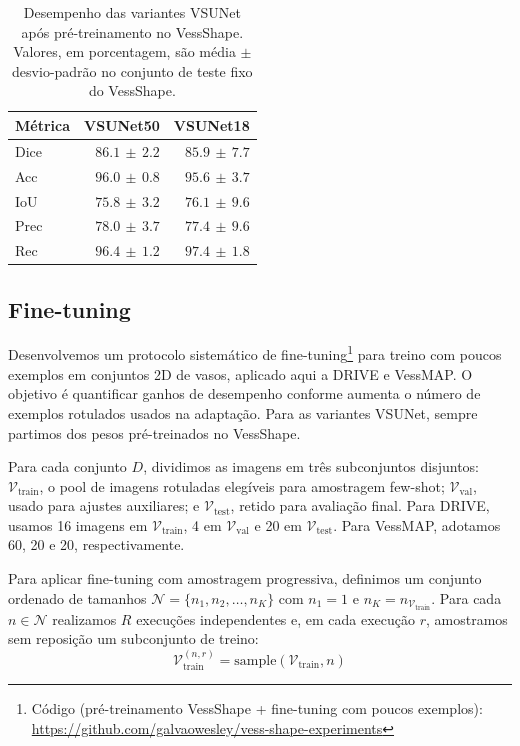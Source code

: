\documentclass[%
reprint,
nofootinbib,
 amsmath,amssymb,
aps,
floatfix,
superscriptaddress,
showkeys,
longbibliography
]{revtex4-1}
\begin{document}
\begin{table}[t]
    \caption{Desempenho das variantes VSUNet após pré-treinamento no VessShape. Valores, em porcentagem, são média $\pm$ desvio-padrão no conjunto de teste fixo do VessShape.}
    \label{tab:vessshape_results_percent}
    \centering
    \begingroup
    \small
    \setlength{\tabcolsep}{6pt}
    \renewcommand{\arraystretch}{1.15}
    \begin{tabular}{l r r}
        \hline
        \textbf{Métrica} & \textbf{VSUNet50} & \textbf{VSUNet18} \\
        \hline
        Dice & $86.1 \,\pm\, 2.2$ & $85.9 \,\pm\, 7.7$ \\
        Acc & $96.0 \,\pm\, 0.8$ & $95.6 \,\pm\, 3.7$ \\
        IoU & $75.8 \,\pm\, 3.2$ & $76.1 \,\pm\, 9.6$ \\
        Prec & $78.0 \,\pm\, 3.7$ & $77.4 \,\pm\, 9.6$ \\
        Rec & $96.4 \,\pm\, 1.2$ & $97.4 \,\pm\, 1.8$ \\
        \hline
    \end{tabular}
    \endgroup
\end{table}



\subsection{Fine-tuning}

Desenvolvemos um protocolo sistemático de fine-tuning\footnote{Código (pré-treinamento VessShape + fine-tuning com poucos exemplos): \url{https://github.com/galvaowesley/vess-shape-experiments} } para treino com poucos exemplos em conjuntos 2D de vasos, aplicado aqui a DRIVE e VessMAP. O objetivo é quantificar ganhos de desempenho conforme aumenta o número de exemplos rotulados usados na adaptação. Para as variantes VSUNet, sempre partimos dos pesos pré-treinados no VessShape.

Para cada conjunto $D$, dividimos as imagens em três subconjuntos disjuntos: $\mathcal{V}_{\text{train}}$, o pool de imagens rotuladas elegíveis para amostragem few-shot; $\mathcal{V}_{\text{val}}$, usado para ajustes auxiliares; e $\mathcal{V}_{\text{test}}$, retido para avaliação final. Para DRIVE, usamos 16 imagens em $\mathcal{V}_{\text{train}}$, 4 em $\mathcal{V}_{\text{val}}$ e 20 em $\mathcal{V}_{\text{test}}$. Para VessMAP, adotamos 60, 20 e 20, respectivamente.

Para aplicar fine-tuning com amostragem progressiva, definimos um conjunto ordenado de tamanhos $\mathcal{N} = \{ n_1, n_2, \ldots, n_K \}$ com $n_1 = 1$ e $n_K = n_{\mathcal{V}_{\text{train}}}$. Para cada $n \in \mathcal{N}$ realizamos $R$ execuções independentes e, em cada execução $r$, amostramos sem reposição um subconjunto de treino:
\[
\mathcal{V}^{(n,r)}_{\text{train}} = \text{sample}(\mathcal{V}_{\text{train}}, n)
\]
\end{document}
